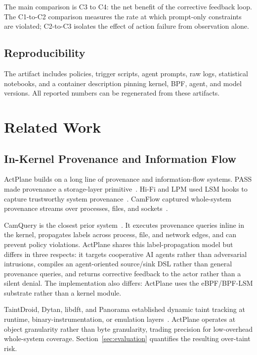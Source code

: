 The main comparison is C3 to C4: the net benefit of the corrective feedback
loop. The C1-to-C2 comparison measures the rate at which prompt-only
constraints are violated; C2-to-C3 isolates the effect of action failure from
observation alone.

\subsection{Reproducibility}

The artifact includes policies, trigger scripts, agent prompts, raw logs,
statistical notebooks, and a container description pinning kernel, BPF, agent,
and model versions. All reported numbers can be regenerated from these
artifacts.


\section{Related Work}
\label{sec:related}

\subsection{In-Kernel Provenance and Information Flow}

ActPlane builds on a long line of provenance and information-flow systems.
PASS made provenance a storage-layer primitive~\cite{muniswamy2006pass}.
Hi-Fi and LPM used LSM hooks to capture trustworthy system
provenance~\cite{pohly2012hifi,bates2015lpm}. CamFlow captured whole-system
provenance streams over processes, files, and sockets~\cite{pasquier2017camflow}.

CamQuery is the closest prior system~\cite{pasquier2018camquery}. It executes
provenance queries inline in the kernel, propagates labels across process, file,
and network edges, and can prevent policy violations. ActPlane shares this
label-propagation model but differs in three respects: it targets cooperative
AI agents rather than adversarial intrusions, compiles an agent-oriented
source/sink DSL rather than general provenance queries, and returns corrective
feedback to the actor rather than a silent denial. The implementation also
differs: ActPlane uses the eBPF/BPF-LSM substrate rather than a kernel module.

TaintDroid, Dytan, libdft, and Panorama established dynamic taint tracking at
runtime, binary-instrumentation, or emulation layers~\cite{enck2010taintdroid,
clause2007dytan,kemerlis2012libdft,yin2007panorama}. ActPlane operates at
object granularity rather than byte granularity, trading precision for
low-overhead whole-system coverage. Section~\ref{sec:evaluation} quantifies
the resulting over-taint risk.

